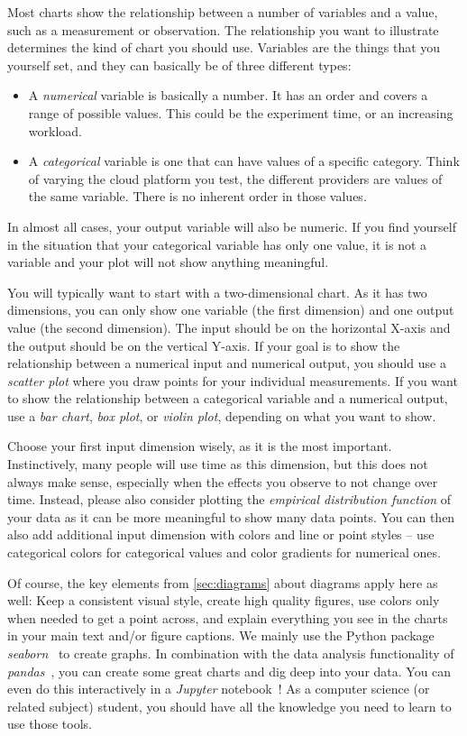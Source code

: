 \documentclass[a4paper]{article}
\begin{document}
Most charts show the relationship between a number of variables and a value, such as a measurement or observation.
The relationship you want to illustrate determines the kind of chart you should use.
Variables are the things that you yourself set, and they can basically be of three different types:

\begin{itemize}
    \item A \emph{numerical} variable is basically a number. It has an order and covers a range of possible values. This could be the experiment time, or an increasing workload.
    \item A \emph{categorical} variable is one that can have values of a specific category. Think of varying the cloud platform you test, the different providers are values of the same variable. There is no inherent order in those values.
\end{itemize}

In almost all cases, your output variable will also be numeric.
If you find yourself in the situation that your categorical variable has only one value, it is not a variable and your plot will not show anything meaningful.

You will typically want to start with a two-dimensional chart.
As it has two dimensions, you can only show one variable (the first dimension) and one output value (the second dimension).
The input should be on the horizontal X-axis and the output should be on the vertical Y-axis.
If your goal is to show the relationship between a numerical input and numerical output, you should use a \emph{scatter plot} where you draw points for your individual measurements.
If you want to show the relationship between a categorical variable and a numerical output, use a \emph{bar chart}, \emph{box plot}, or \emph{violin plot}, depending on what you want to show.

Choose your first input dimension wisely, as it is the most important.
Instinctively, many people will use time as this dimension, but this does not always make sense, especially when the effects you observe to not change over time.
Instead, please also consider plotting the \emph{empirical distribution function} of your data as it can be more meaningful to show many data points.
You can then also add additional input dimension with colors and line or point styles -- use categorical colors for categorical values and color gradients for numerical ones.

Of course, the key elements from \cref{sec:diagrams} about diagrams apply here as well:
Keep a consistent visual style, create high quality figures, use colors only when needed to get a point across, and explain everything you see in the charts in your main text and/or figure captions.
We mainly use the Python package \emph{seaborn}~\cite{seaborn} to create graphs.
In combination with the data analysis functionality of \emph{pandas}~\cite{pandas}, you can create some great charts and dig deep into your data.
You can even do this interactively in a \emph{Jupyter} notebook~\cite{jupyter}!
As a computer science (or related subject) student, you should have all the knowledge you need to learn to use those tools.
\end{document}
